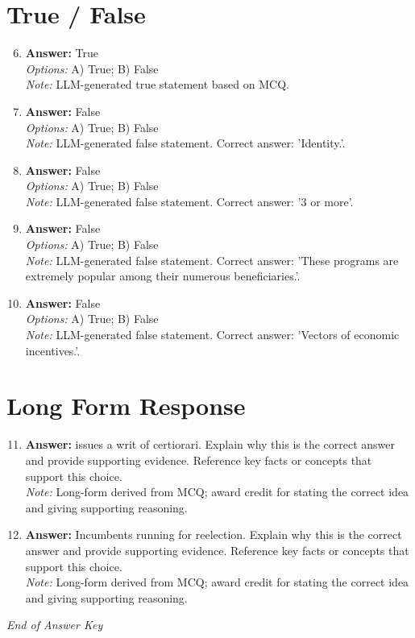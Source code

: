 \documentclass[12pt]{article}
\begin{document}
\section*{True / False}
\begin{enumerate}[label=\arabic*.]
\setcounter{enumi}{5}
\item \textbf{Answer:} True
\\ \textit{Options:} A) True; B) False
\\ \textit{Note:} LLM-generated true statement based on MCQ.
\item \textbf{Answer:} False
\\ \textit{Options:} A) True; B) False
\\ \textit{Note:} LLM-generated false statement. Correct answer: 'Identity.'.
\item \textbf{Answer:} False
\\ \textit{Options:} A) True; B) False
\\ \textit{Note:} LLM-generated false statement. Correct answer: '3 or more'.
\item \textbf{Answer:} False
\\ \textit{Options:} A) True; B) False
\\ \textit{Note:} LLM-generated false statement. Correct answer: 'These programs are extremely popular among their numerous beneficiaries.'.
\item \textbf{Answer:} False
\\ \textit{Options:} A) True; B) False
\\ \textit{Note:} LLM-generated false statement. Correct answer: 'Vectors of economic incentives.'.
\end{enumerate}

\section*{Long Form Response}
\begin{enumerate}[label=\arabic*.]
\setcounter{enumi}{10}
\item \textbf{Answer:} issues a writ of certiorari. Explain why this is the correct answer and provide supporting evidence. Reference key facts or concepts that support this choice.
\\ \textit{Note:} Long-form derived from MCQ; award credit for stating the correct idea and giving supporting reasoning.
\item \textbf{Answer:} Incumbents running for reelection. Explain why this is the correct answer and provide supporting evidence. Reference key facts or concepts that support this choice.
\\ \textit{Note:} Long-form derived from MCQ; award credit for stating the correct idea and giving supporting reasoning.
\end{enumerate}

\vfill
\noindent\textit{End of Answer Key}
\end{document}
